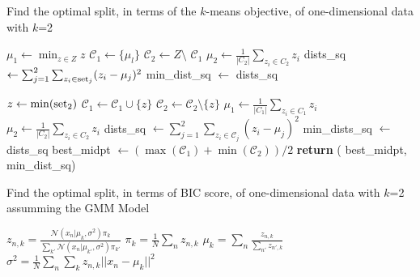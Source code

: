 \begin{algorithm}
\caption{Find the optimal split, in terms of the $k$-means objective, of one-dimensional data with $k$=2}\label{alg:twomeansOneD}
\begin{algorithmic}[1]
\State  $\mu_1 \gets \min_{z \in Z} z $ 
\State $\mathcal{C}_1 \gets \lbrace \mu_l \rbrace $
\State $\mathcal{C}_2 \gets Z \setminus$ $\mathcal{C}_1$ 
\State $\mu_2 \gets\frac{1}{|C_2|} \sum_{ z_i \in C_2 } z_i $  
\State dists\_sq $\gets \sum_{j=1}^2 \sum_{z_i \in \textnormal{set}_j} (z_i - \mu_j)^2$ 
\State min\_dist\_sq $\gets$ dists\_sq

	\State $z \gets \min (\textnormal{set}_2)$
	\State $\mathcal{C}_1 \gets \mathcal{C}_1 \cup \lbrace z \rbrace$
	\State $\mathcal{C}_2 \gets \mathcal{C}_2 \setminus \lbrace z \rbrace$ 
	\State $\mu_1 \gets \frac{1}{|C_1|} \sum_{ z_i \in C_1 } z_i $  
	\State $\mu_2 \gets\frac{1}{|C_2|} \sum_{ z_i \in C_2 } z_i $  	
	\State dists\_sq $\gets \sum_{j=1}^2 \sum_{z_i \in \mathcal{C}_j} (z_i - \mu_j)^2$ 	
		\State min\_dists\_sq $\gets$ dists\_sq
		\State best\_midpt $\gets (\max(\mathcal{C}_1)+\min(\mathcal{C}_2))/2 $  %
	\EndIf	
   \EndWhile
\State \textbf{return} ( best\_midpt, min\_dist\_sq)

\EndProcedure
\end{algorithmic}
\end{algorithm}


\begin{algorithm}
\caption{Find the optimal split, in terms of BIC score, of one-dimensional data with $k$=2 assumming the GMM Model}
\label{alg:gmm}
\begin{algorithmic}[1]

\State $z_{n,k} = \frac{\mathcal{N}(x_n|\mu_k, \sigma^2)\pi_k}{\sum_{k'}\mathcal{N}(x_n|\mu_{k'}, \sigma^2)\pi_{k'}} $%
\State   $\pi_k = \frac{1}{N} \sum_n z_{n,k}$
\State $\mu_k = \sum_{n} \frac{z_{n,k}}{\sum_{n'} z_{n', k}}$
\State $\sigma^2 = \frac{1}{N} \sum_{n} \sum_{k} z_{n,k} ||x_n - \mu_k||^2$
 
\EndProcedure
\end{algorithmic}
\end{algorithm}


